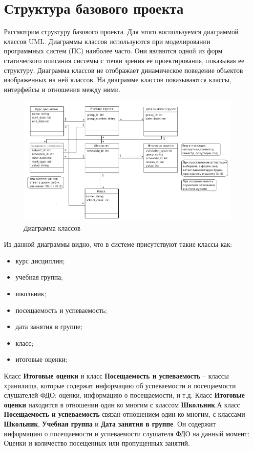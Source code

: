 \section{Структура базового проекта}

\hspace*{0.5cm}Рассмотрим структуру базового проекта. Для этого воспользуемся диаграммой классов UML. Диаграммы классов используются при моделировании программных систем (ПС) наиболее часто. Они являются одной из форм статического описания системы с точки зрения ее проектирования, показывая ее структуру. Диаграмма классов не отображает динамическое поведение объектов изображенных на ней классов. На диаграмме классов показываются классы, интерфейсы и отношения между ними.
\begin{figure}[h!]
\begin{center}
\includegraphics[scale=0.6]{image/class_my.png}
\end{center}
\caption{Диаграмма классов}
\end{figure}
\hspace*{0.5cm}Из данной диаграммы видно, что в системе присутствуют такие классы как:\\
\begin{itemize}
\item курс дисциплин;
\item учебная группа;
\item школьник;
\item посещаемость и успеваемость;
\item дата занятия в группе;
\item класс;
\item итоговые оценки;
\end{itemize}
\hspace*{0.5cm}Класс \textbf{Итоговые оценки} и класс \textbf{Посещаемость и успеваемость} -- классы хранилища, которые содержат информацию об успеваемости и посещаемости слушателей ФДО: оценки, информацию о посещаемости, и т.д. Класс \textbf{Итоговые оценки} находится в отношении один ко многим с классом \textbf{Школьник}.А класс \textbf{Посещаемость и успеваемость} связан отношением один ко многим, с классами \textbf{Школьник}, \textbf{Учебная группа} и \textbf{Дата занятия в группе}. Он содержит информацию о посещаемости и успеваемости слушателя ФДО на данный момент: Оценки и количество посещенных или пропущенных занятий.\\

